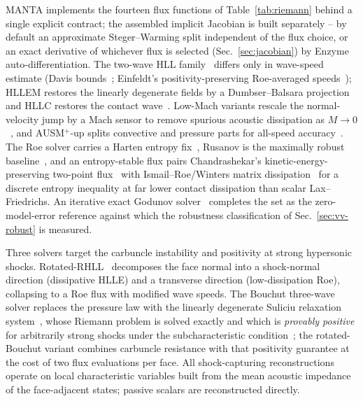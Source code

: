 \documentclass[journal,biblatex]{new-aiaa}
\begin{document}
MANTA implements the fourteen flux functions of Table~\ref{tab:riemann} behind a single explicit contract; the assembled implicit Jacobian is built separately -- by default an approximate Steger--Warming split independent of the flux choice, or an exact derivative of whichever flux is selected (Sec.~\ref{sec:jacobian}) by Enzyme auto-differentiation. The two-wave HLL family~\cite{harten_high_1983} differs only in wave-speed estimate (Davis bounds~\cite{davis_simplified_1988}; Einfeldt's positivity-preserving Roe-averaged speeds~\cite{einfeldt_godunov-type_1988,einfeldt_godunov-type_1991}); HLLEM restores the linearly degenerate fields by a Dumbser--Balsara projection~\cite{dumbser_new_2016} and HLLC restores the contact wave~\cite{toro_restoration_1994}. Low-Mach variants rescale the normal-velocity jump by a Mach sensor to remove spurious acoustic dissipation as $M\to0$~\cite{rieper_low-mach_2011,thornber_improved_2008,fleischmann_shock-stable_2020}, and AUSM$^+$-up splits convective and pressure parts for all-speed accuracy~\cite{liou_sequel_1996,liou_sequel_2006}. The Roe solver carries a Harten entropy fix~\cite{roe_approximate_1997}, Rusanov is the maximally robust baseline~\cite{rusanov_calculation_1962}, and an entropy-stable flux pairs Chandrashekar's kinetic-energy-preserving two-point flux~\cite{chandrashekar_kinetic_2013} with Ismail--Roe/Winters matrix dissipation~\cite{ismail_affordable_2009,winters_affordable_2016} for a discrete entropy inequality at far lower contact dissipation than scalar Lax--Friedrichs. An iterative exact Godunov solver~\cite{toro_riemann_2009} completes the set as the zero-model-error reference against which the robustness classification of Sec.~\ref{sec:vv-robust} is measured.

Three solvers target the carbuncle instability and positivity at strong hypersonic shocks. Rotated-RHLL~\cite{nishikawa_very_2008,ren_robust_2003} decomposes the face normal into a shock-normal direction (dissipative HLLE) and a transverse direction (low-dissipation Roe), collapsing to a Roe flux with modified wave speeds. The Bouchut three-wave solver replaces the pressure law with the linearly degenerate Suliciu relaxation system~\cite{suliciu_modelling_1990,chalons_relaxation_2008}, whose Riemann problem is solved exactly and which is \emph{provably positive} for arbitrarily strong shocks under the subcharacteristic condition~\cite{bouchut_nonlinear_2004}; the rotated-Bouchut variant combines carbuncle resistance with that positivity guarantee at the cost of two flux evaluations per face. All shock-capturing reconstructions operate on local characteristic variables built from the mean acoustic impedance of the face-adjacent states; passive scalars are reconstructed directly.
\end{document}
